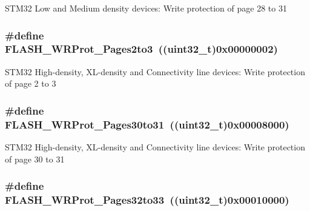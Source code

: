 STM32 Low and Medium density devices: Write protection of page 28 to 31 \hypertarget{group__Option__Bytes__Write__Protection_gaeeb592e66053dde68ebb3ff3926d033d}{
\subsubsection[{FLASH\_\-WRProt\_\-Pages2to3}]{\setlength{\rightskip}{0pt plus 5cm}\#define FLASH\_\-WRProt\_\-Pages2to3~((uint32\_\-t)0x00000002)}}
\label{group__Option__Bytes__Write__Protection_gaeeb592e66053dde68ebb3ff3926d033d}
STM32 High-\/density, XL-\/density and Connectivity line devices: Write protection of page 2 to 3 \hypertarget{group__Option__Bytes__Write__Protection_gaabe41461f613c6eb37c782295ad9f90f}{
\subsubsection[{FLASH\_\-WRProt\_\-Pages30to31}]{\setlength{\rightskip}{0pt plus 5cm}\#define FLASH\_\-WRProt\_\-Pages30to31~((uint32\_\-t)0x00008000)}}
\label{group__Option__Bytes__Write__Protection_gaabe41461f613c6eb37c782295ad9f90f}
STM32 High-\/density, XL-\/density and Connectivity line devices: Write protection of page 30 to 31 \hypertarget{group__Option__Bytes__Write__Protection_ga86aa121a8917e58ad6bfdf98ba873d36}{
\subsubsection[{FLASH\_\-WRProt\_\-Pages32to33}]{\setlength{\rightskip}{0pt plus 5cm}\#define FLASH\_\-WRProt\_\-Pages32to33~((uint32\_\-t)0x00010000)}}
\label{group__Option__Bytes__Write__Protection_ga86aa121a8917e58ad6bfdf98ba873d36}
